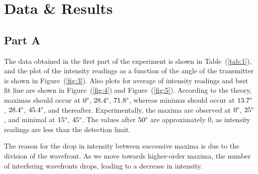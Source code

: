 \documentclass[10pt]{article}
\begin{document}
\section{Data \& Results}

\subsection*{Part A}

The data obtained in the first part of the experiment is shown in Table~(\ref{tab:1}), and the plot of the intensity readings as a function of the angle of the transmitter is shown in Figure~(\ref{fig:3}).
Also plots for average of intensity readings and best fit line are shown in Figure~(\ref{fig:4}) and Figure~(\ref{fig:5}).
According to the theory, maximas should occur at $0\degree$, $28.4\degree$, $71.8\degree$, whereas minimas should occur at $13.7\degree$, $28.4\degree$, $45.4\degree$, and thereafter. Experimentally, the maxima are observed at $0\degree$, $25\degree$, and minimal at $15\degree$, $45\degree$. The values after $50\degree$ are approximately 0, as intensity readings are less than the detection limit.

The reason for the drop in intensity between successive maxima is due to the division of the wavefront. As we move towards higher-order maxima, the number of interfering wavefronts drops, leading to a decrease in intensity. 
\end{document}
